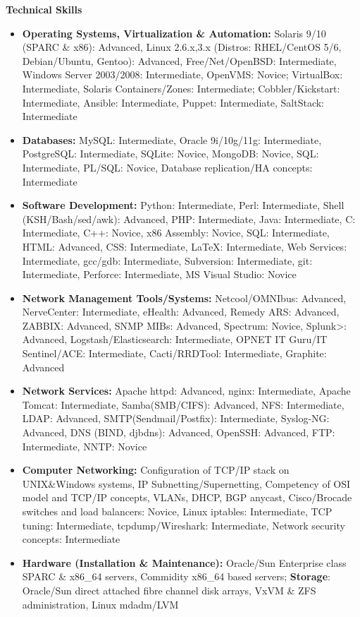 \documentclass[10pt,oneside]{article}
\newenvironment{ressection}[1]{
  \vspace{4pt}
  \textbf{\selectfont\normalsize#1}
  \begin{itemize}
  \vspace{3pt}
}{
  \end{itemize}
}
\newcommand{\resitem}[1]{
  \vspace{-4pt}
  \item \begin{flushleft} #1 \end{flushleft}
}
\begin{document}
\begin{ressection}{Technical Skills}

  \resitem{\textbf{Operating Systems, Virtualization \& Automation:} Solaris 9/10 (SPARC \& x86): Advanced, Linux 2.6.x,3.x (Distros: RHEL/CentOS 5/6, Debian/Ubuntu, Gentoo): Advanced, Free/Net/OpenBSD: Intermediate, Windows Server 2003/2008: Intermediate, OpenVMS: Novice; VirtualBox: Intermediate, Solaris Containers/Zones: Intermediate; Cobbler/Kickstart: Intermediate, Ansible: Intermediate, Puppet: Intermediate, SaltStack: Intermediate}

  \resitem{\textbf{Databases:} MySQL: Intermediate, Oracle 9i/10g/11g: Intermediate, PostgreSQL: Intermediate, SQLite: Novice, MongoDB: Novice, SQL: Intermediate, PL/SQL: Novice, Database replication/HA concepts: Intermediate}

  \resitem{\textbf{Software Development:} Python: Intermediate, Perl: Intermediate, Shell (KSH/Bash/sed/awk): Advanced, PHP: Intermediate, Java: Intermediate, C: Intermediate, C++: Novice, x86 Assembly: Novice, SQL: Intermediate, HTML: Advanced, CSS: Intermediate,  \LaTeX: Intermediate,  Web Services: Intermediate, gcc/gdb: Intermediate, Subversion: Intermediate, git: Intermediate, Perforce: Intermediate, MS Visual Studio: Novice}

  \resitem{\textbf{Network Management Tools/Systems:} Netcool/OMNIbus: Advanced, NerveCenter: Intermediate, eHealth: Advanced, Remedy ARS: Advanced, ZABBIX: Advanced, SNMP MIBs: Advanced, Spectrum: Novice, Splunk>: Advanced, Logstash/Elasticsearch: Intermediate, OPNET IT Guru/IT Sentinel/ACE: Intermediate, Cacti/RRDTool: Intermediate, Graphite: Advanced}

  \resitem{\textbf{Network Services:} Apache httpd: Advanced, nginx: Intermediate, Apache Tomcat: Intermediate, Samba(SMB/CIFS): Advanced, NFS: Intermediate, LDAP: Advanced, SMTP(Sendmail/Postfix): Intermediate, Syslog-NG: Advanced, DNS (BIND, djbdns): Advanced, OpenSSH: Advanced, FTP: Intermediate, NNTP: Novice}

  \resitem{\textbf{Computer Networking:} Configuration of TCP/IP stack on UNIX\&Windows systems, IP Subnetting/Supernetting, Competency of OSI model and TCP/IP concepts, VLANs, DHCP, BGP anycast, Cisco/Brocade switches and load balancers: Novice, Linux iptables: Intermediate, TCP tuning: Intermediate, tcpdump/Wireshark: Intermediate, Network security concepts: Intermediate}

  \resitem{\textbf{Hardware (Installation \& Maintenance):} Oracle/Sun Enterprise class SPARC \& x86\_64 servers, Commidity x86\_64 based servers; \textbf{Storage}: Oracle/Sun direct attached fibre channel disk arrays, VxVM \& ZFS administration, Linux mdadm/LVM}


  
\end{ressection}
\end{document}
